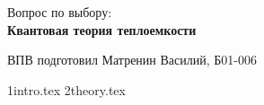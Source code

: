 \documentclass[11pt,a4paper,oneside]{article} %
\begin{document}
    \begin{center}

        \Huge
        Вопрос по выбору: \\ \textbf {Квантовая теория теплоемкости}

    \end{center}

    \vspace{16cm}

    \begin{flushright}

        \normalsize
        ВПВ подготовил Матренин Василий, Б01-006

    \end{flushright}

    \newpage

     {1intro.tex}
     {2theory.tex}
\end{document}
